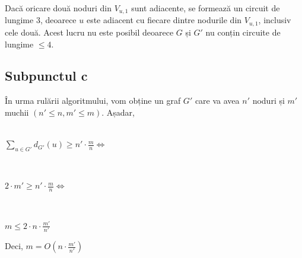 \documentclass{article}
\begin{document}
{\fontsize{14}{16}\selectfont
\par Dacă oricare două noduri din $V_{u,1}$ sunt adiacente, se formează un circuit de lungime 3, deoarece $u$ este adiacent cu fiecare dintre nodurile din $V_{u,1}$, inclusiv cele două. Acest lucru nu este posibil deoarece $G$ și $G'$ nu conțin circuite de lungime $\le 4$.}

\subsection*{\fontsize{16}{30}\selectfont Subpunctul c}
{\fontsize{14}{16}\selectfont
\par În urma rulării algoritmului, vom obține un graf $G'$ care va avea $n'$ noduri și $m'$ muchii $(n' \le n, m' \le m)$. Așadar, \\
\\ \centerline {$\sum_{u \in G'} {d}_{G'}(u) \ge n' \cdot \frac{m}{n} \Leftrightarrow$}
\\ \centerline {$2 \cdot m' \ge n' \cdot \frac{m}{n} \Leftrightarrow$}
\\ \centerline {$m \le 2 \cdot n \cdot \frac{m'}{n'}$}
Deci, $m = O(n \cdot \frac{m'}{n'})$
}
\end{document}
